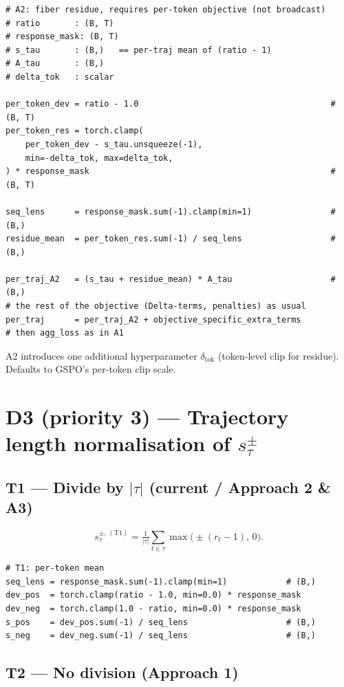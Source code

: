 \documentclass[11pt]{article}
\begin{document}
\begin{lstlisting}
# A2: fiber residue, requires per-token objective (not broadcast)
# ratio       : (B, T)
# response_mask: (B, T)
# s_tau       : (B,)   == per-traj mean of (ratio - 1)
# A_tau       : (B,)
# delta_tok   : scalar

per_token_dev = ratio - 1.0                                       # (B, T)
per_token_res = torch.clamp(
    per_token_dev - s_tau.unsqueeze(-1),
    min=-delta_tok, max=delta_tok,
) * response_mask                                                 # (B, T)

seq_lens      = response_mask.sum(-1).clamp(min=1)                # (B,)
residue_mean  = per_token_res.sum(-1) / seq_lens                  # (B,)

per_traj_A2   = (s_tau + residue_mean) * A_tau                    # (B,)
# the rest of the objective (Delta-terms, penalties) as usual
per_traj      = per_traj_A2 + objective_specific_extra_terms
# then agg_loss as in A1
\end{lstlisting}

A2 introduces one additional hyperparameter $\delta_{\text{tok}}$
(token-level clip for residue). Defaults to GSPO's per-token clip scale.

\section{D3 (priority 3) --- Trajectory length normalisation of $s_\tau^\pm$}
\label{sec:d3}

\subsection{T1 --- Divide by $|\tau|$ (current / Approach 2 \& A3)}

\[
s_\tau^{\pm,\,(\text{T1})}
= \tfrac{1}{|\tau|}\sum_{t\in\tau}\max\!\bigl(\pm(r_t-1),\,0\bigr).
\]

\begin{lstlisting}
# T1: per-token mean
seq_lens = response_mask.sum(-1).clamp(min=1)            # (B,)
dev_pos  = torch.clamp(ratio - 1.0, min=0.0) * response_mask
dev_neg  = torch.clamp(1.0 - ratio, min=0.0) * response_mask
s_pos    = dev_pos.sum(-1) / seq_lens                    # (B,)
s_neg    = dev_neg.sum(-1) / seq_lens                    # (B,)
\end{lstlisting}

\subsection{T2 --- No division (Approach 1)}
\end{document}
